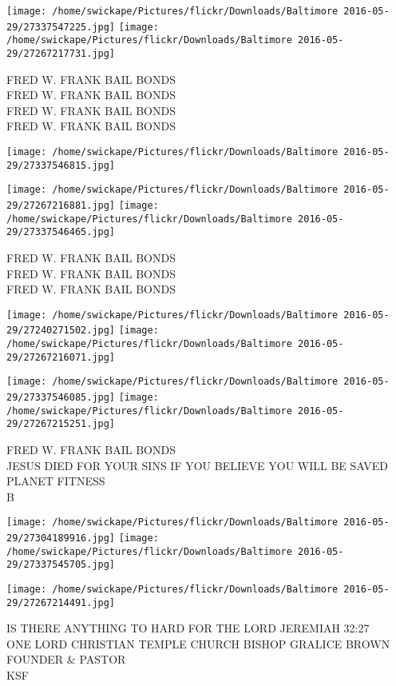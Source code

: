 \documentclass[10pt,letterpaper]{article}
\begin{document}
\texttt{[image: /home/swickape/Pictures/flickr/Downloads/Baltimore 2016-05-29/27337547225.jpg]}
\texttt{[image: /home/swickape/Pictures/flickr/Downloads/Baltimore 2016-05-29/27267217731.jpg]}

FRED W. FRANK BAIL BONDS\\
FRED W. FRANK BAIL BONDS\\
FRED W. FRANK BAIL BONDS\\
FRED W. FRANK BAIL BONDS
\pagebreak

\texttt{[image: /home/swickape/Pictures/flickr/Downloads/Baltimore 2016-05-29/27337546815.jpg]}

\vspace{0.25in}
\texttt{[image: /home/swickape/Pictures/flickr/Downloads/Baltimore 2016-05-29/27267216881.jpg]}
\texttt{[image: /home/swickape/Pictures/flickr/Downloads/Baltimore 2016-05-29/27337546465.jpg]}

FRED W. FRANK BAIL BONDS\\
FRED W. FRANK BAIL BONDS\\
FRED W. FRANK BAIL BONDS
\pagebreak

\texttt{[image: /home/swickape/Pictures/flickr/Downloads/Baltimore 2016-05-29/27240271502.jpg]}
\texttt{[image: /home/swickape/Pictures/flickr/Downloads/Baltimore 2016-05-29/27267216071.jpg]}

\texttt{[image: /home/swickape/Pictures/flickr/Downloads/Baltimore 2016-05-29/27337546085.jpg]}
\texttt{[image: /home/swickape/Pictures/flickr/Downloads/Baltimore 2016-05-29/27267215251.jpg]}

FRED W. FRANK BAIL BONDS\\
JESUS DIED FOR YOUR SINS IF YOU BELIEVE YOU WILL BE SAVED\\
PLANET FITNESS\\
B
\pagebreak

\texttt{[image: /home/swickape/Pictures/flickr/Downloads/Baltimore 2016-05-29/27304189916.jpg]}
\texttt{[image: /home/swickape/Pictures/flickr/Downloads/Baltimore 2016-05-29/27337545705.jpg]}

\vspace{0.25in}
\texttt{[image: /home/swickape/Pictures/flickr/Downloads/Baltimore 2016-05-29/27267214491.jpg]}

IS THERE ANYTHING TO HARD FOR THE LORD JEREMIAH 32:27\\
ONE LORD CHRISTIAN TEMPLE CHURCH BISHOP GRALICE BROWN FOUNDER \& PASTOR\\
KSF
\pagebreak
\end{document}
